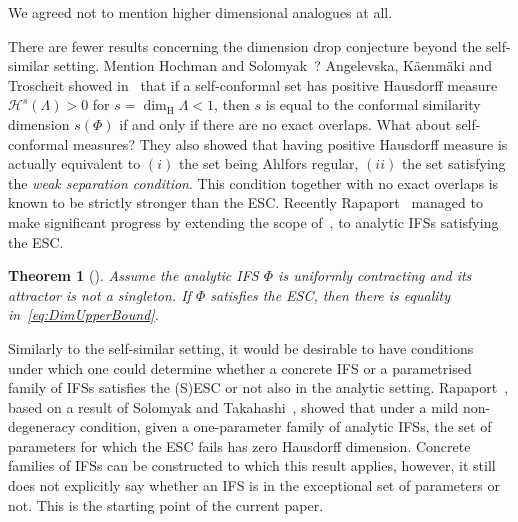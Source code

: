 \documentclass[12pt,]{article}
\newtheorem{theorem}{Theorem}[section]
\theoremstyle{definition}
\theoremstyle{remark}
\newcommand{\0}{\mathbf{0}}
\begin{document}
{{\color{red} We agreed not to mention higher dimensional analogues at all.
}


There are fewer results concerning the dimension drop conjecture beyond the self-similar setting.
{\color{red} Mention Hochman and Solomyak~\cite{HochmanSolomyak_Invent17}?} Angelevska,
K\"{a}enm\"{a}ki and Troscheit showed in~\cite{AngelevskaKaenmakiTroscheit2020} that if a
self-conformal set has positive Hausdorff measure $\mathcal{H}^s(\Lambda)>0$ for
$s=\dim_{\mathrm{H}}\Lambda<1$, then $s$ is equal to the conformal similarity dimension $s(\Phi)$ if
and only if there are no exact overlaps. {\color{red} What about self-conformal measures?} They also
showed that having positive Hausdorff measure is actually equivalent to $(i)$ the set being Ahlfors
regular, $(ii)$ the set satisfying the \emph{weak separation condition}. This condition together
with no exact overlaps is known to be strictly stronger than the ESC. Recently
Rapaport~\cite{Rapaport_SelfConfESC25arXiv} managed to make significant progress by extending the
scope of~\cite{AngelevskaKaenmakiTroscheit2020}, \cite{Hochman_SelfSimESC_Annals} to analytic IFSs satisfying the ESC.

\begin{theorem}[\cite{Rapaport_SelfConfESC25arXiv}]\label{thm:RapaportMain}
Assume the analytic IFS $\Phi$ is uniformly contracting and its attractor is not a singleton. If $\Phi$ satisfies the ESC, then there is equality in~\cref{eq:DimUpperBound}.
\end{theorem}

Similarly to the self-similar setting, it would be desirable to have conditions under which one could determine whether a concrete IFS or a parametrised family of IFSs satisfies the (S)ESC or not also in the analytic setting. Rapaport~\cite[Corollary 1.4]{Rapaport_SelfConfESC25arXiv}, based on a result of Solomyak and Takahashi~\cite{SolomyakTakahashi_IMRN21}, showed that under a mild non-degeneracy condition, given a one-parameter family of analytic IFSs, the set of parameters for which the ESC fails has zero Hausdorff dimension. Concrete families of IFSs can be constructed to which this result applies, however, it still does not explicitly say whether an IFS is in the exceptional set of parameters or not. This is the starting point of the current paper.

}
\end{document}
